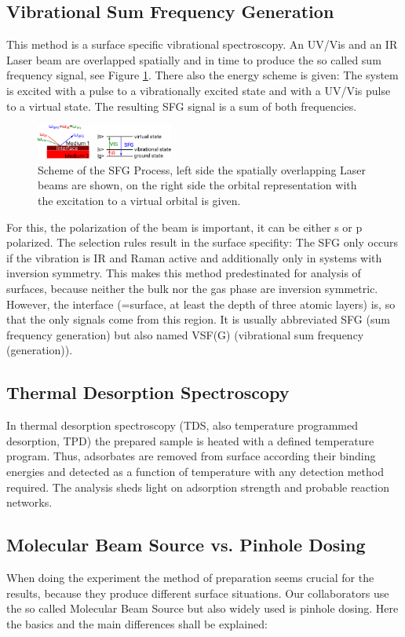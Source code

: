 \documentclass[11pt,DIV=13,BCOR=5mm,a4paper,headinclude]{scrbook}
\begin{document}
\subsection{Vibrational Sum Frequency Generation}
This method is a surface specific vibrational spectroscopy.
An UV/Vis and an IR Laser beam are overlapped spatially and in time to produce the so called sum frequency signal, see Figure \ref{abb:sfg_scheme}.
There also the energy scheme is given: The system is excited with a pulse to a vibrationally excited state and with a UV/Vis pulse to a virtual state.
The resulting SFG signal is a sum of both frequencies.
\begin{figure}[!h]
\centering
 \includegraphics[width=0.4\textwidth]{figures/theory/sfg-scheme.pdf}
   \caption{Scheme of the SFG Process, left side the spatially overlapping Laser beams are shown, on the right side the orbital representation with the excitation to a virtual orbital is given.}
            \label{abb:sfg_scheme}
\end{figure}
For this, the polarization of the beam is important, it can be either s or p polarized.
The selection rules result in the surface specifity: The SFG only occurs if the vibration is IR and Raman active and additionally only in systems with inversion symmetry.
This makes this method predestinated for analysis of surfaces, because neither the bulk nor the gas phase are inversion symmetric.
However, the interface (=surface, at least the depth of three atomic layers) is, so that the only signals come from this region.
It is usually abbreviated SFG (sum frequency generation) but also named VSF(G) (vibrational sum frequency (generation)).
 
\subsection{Thermal Desorption Spectroscopy}
In thermal desorption spectroscopy (TDS, also temperature programmed desorption, TPD) the prepared sample is heated with a defined temperature program.
Thus, adsorbates are removed from surface according their binding energies and detected as a function of temperature with any detection method required.
The analysis sheds light on adsorption strength and probable reaction networks.

\subsection{Molecular Beam Source vs. Pinhole Dosing}\label{mbs_vs_pd}
When doing the experiment the method of preparation seems crucial for the results, because they produce different surface situations.
Our collaborators use the so called Molecular Beam Source but also widely used is pinhole dosing.
Here the basics and the main differences shall be explained:
\end{document}
